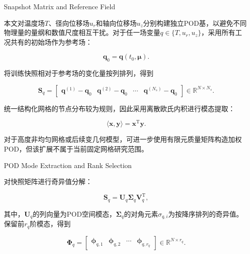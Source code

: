 {Snapshot Matrix and Reference Field}

本文对温度场$T$、径向位移场$u_r$和轴向位移场$u_z$分别构建独立POD基，以避免不同物理量的量纲和数值尺度相互干扰。对于任一场变量$q\in\{T,u_r,u_z\}$，采用所有工况共有的初始场作为参考场：

\begin{equation}
	\boldsymbol{q}_0
	=
	\boldsymbol{q}(t_0,\boldsymbol{\mu}).
	\label{eq:pod_reference_field_complete}
\end{equation}

将训练快照相对于参考场的变化量按列排列，得到

\begin{equation}
	\boldsymbol{S}_q
	=
	\begin{bmatrix}
		\boldsymbol{q}^{(1)}-\boldsymbol{q}_0 &
		\boldsymbol{q}^{(2)}-\boldsymbol{q}_0 &
		\cdots &
		\boldsymbol{q}^{(N_s)}-\boldsymbol{q}_0
	\end{bmatrix}
	\in\mathbb{R}^{N\times N_s}.
	\label{eq:pod_snapshot_matrix_complete}
\end{equation}

统一结构化网格的节点分布较为规则，因此采用离散欧氏内积进行模态提取：

\begin{equation}
	\langle\boldsymbol{x},\boldsymbol{y}\rangle
	=\boldsymbol{x}^{\mathrm T}\boldsymbol{y}.
	\label{eq:pod_inner_product_complete}
\end{equation}

对于高度非均匀网格或后续变几何模型，可进一步使用有限元质量矩阵构造加权POD，但该扩展不属于当前固定网格研究范围。

{POD Mode Extraction and Rank Selection}

对快照矩阵进行奇异值分解：

\begin{equation}
	\boldsymbol{S}_q
	=
	\boldsymbol{U}_q
	\boldsymbol{\Sigma}_q
	\boldsymbol{V}_q^{\mathrm T},
	\label{eq:pod_svd_complete}
\end{equation}

其中，$\boldsymbol{U}_q$的列向量为POD空间模态，$\boldsymbol{\Sigma}_q$的对角元素$\sigma_{q,i}$为按降序排列的奇异值。保留前$r_q$阶模态，得到

\begin{equation}
	\boldsymbol{\Phi}_q
	=
	\begin{bmatrix}
		\boldsymbol{\phi}_{q,1} &
		\boldsymbol{\phi}_{q,2} &
		\cdots &
		\boldsymbol{\phi}_{q,r_q}
	\end{bmatrix}
	\in\mathbb{R}^{N\times r_q}.
	\label{eq:pod_basis_complete}
\end{equation}


